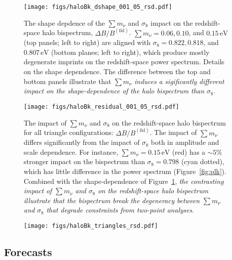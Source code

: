 \documentclass[12pt, letterpaper, preprint]{aastex62}
\newcommand{\smnu}{\sum m_\nu}
\newcommand{\sig}{\sigma_8}
\newcommand{\ch}[1]{{\color{orange}{\bf CH:} #1}}
\begin{document}
\begin{figure}
\begin{center}
\texttt{[image: figs/haloBk\_dshape\_001\_05\_rsd.pdf]} 
    \caption{The shape depdence of the $\smnu$ and $\sig$ impact on the 
    redshift-space halo bispectrum, $\Delta B/B^\mathrm{(fid)}$. 
    $\smnu = 0.06, 0.10$, and $0.15\,\mathrm{eV}$ (top panels; left to right) are aligned
    with $\sig = 0.822, 0.818$, and $0.807\,\mathrm{eV}$ (bottom planes; left to right),
    which produce mostly degenerate imprints on the redshift-space power 
    spectrum. \ch{Details on the shape dependence}. 
    The difference between the top and bottom panels illustrate 
    that {\em $\smnu$ induces a sigificantly different impact on the 
    shape-dependence of the halo bispectrum than $\sig$}. 
    }
\label{fig:dbk_shape}
\end{center}
\end{figure}


\begin{figure}
\begin{center}
\texttt{[image: figs/haloBk\_residual\_001\_05\_rsd.pdf]}
    \caption{The impact of $\smnu$ and $\sig$ on the redshift-space 
    halo bispectrum for all triangle configurations: $\Delta B/B^\mathrm{(fid)}$. 
    The impact of $\smnu$ differs significantly from the impact of $\sig$ 
    both in amplitude and scale dependence. For instance, $\smnu = 0.15\,\mathrm{eV}$ 
    (red) has a $\sim 5\%$ stronger impact on the bispectrum than $\sig = 0.798$ 
    (cyan dotted), which has little difference in the power spectrum (Figure~\ref{fig:plk}). 
    Combined with the shape-dependence of Figure~\ref{fig:dbk_shape}, {\em the 
    contrasting impact of $\smnu$ and $\sig$ on the redshift-space halo bispectrum 
    illustrate that the bispectrum break the degeneracy between $\smnu$
    and $\sig$ that degrade constraints from two-point analyses}. 
    }
\label{fig:dbk_amp}
\end{center}
\end{figure}


\begin{figure}
\begin{center}
\texttt{[image: figs/haloBk\_triangles\_rsd.pdf]}
    \caption{}
\label{fig:dbk_amp}
\end{center}
\end{figure}

\subsection{Forecasts}
\end{document}
